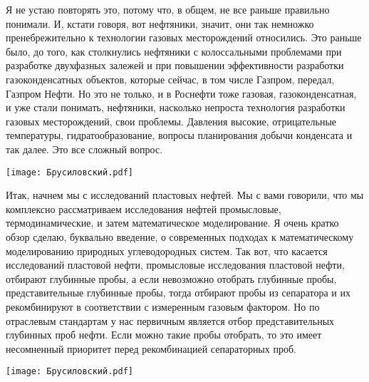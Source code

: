 \documentclass[main.tex]{subfiles}
\begin{document}
Я не устаю повторять это, потому что, в общем, не все раньше правильно понимали.
И, кстати говоря, вот нефтяники, значит, они так немножко пренебрежительно к технологии газовых месторождений относились.
Это раньше было, до того, как столкнулись нефтяники с колоссальными проблемами при разработке двухфазных залежей и при повышении эффективности разработки газоконденсатных объектов, которые сейчас, в том числе Газпром, передал, Газпром Нефти.
Но это не только, и в Роснефти тоже газовая, газоконденсатная, и уже стали понимать, нефтяники, насколько непроста технология разработки газовых месторождений, свои проблемы.
Давления высокие, отрицательные температуры, гидратообразование, вопросы планирования добычи конденсата и так далее.
Это все сложный вопрос.

\begin{center}
\texttt{[image: Брусиловский.pdf]}
\end{center}

Итак, начнем мы с исследований пластовых нефтей.
Мы с вами говорили, что мы комплексно рассматриваем исследования нефтей промысловые, термодинамические, и затем математическое моделирование.
Я очень кратко обзор сделаю, буквально введение, о современных подходах к математическому моделированию природных углеводородных систем.
Так вот, что касается исследований пластовой нефти, промысловые исследования пластовой нефти, отбирают глубинные пробы, а если невозможно отобрать глубинные пробы, представительные глубинные пробы, тогда отбирают пробы из сепаратора и их рекомбинируют в соответствии с измеренным газовым фактором.
Но по отраслевым стандартам у нас первичным является отбор представительных глубинных проб нефти.
Если можно такие пробы отобрать, то это имеет несомненный приоритет перед рекомбинацией сепараторных проб.

\begin{center}
\texttt{[image: Брусиловский.pdf]}
\end{center}
\end{document}
